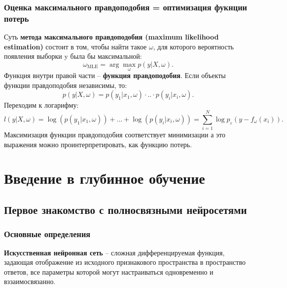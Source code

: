 \documentclass[a4paper, 10pt, openany]{book} %
\begin{document}
	\subsection{Оценка максимального правдоподобия = оптимизация фукнции потерь}
	
	Суть \textbf{метода максимального правдоподобия (maximum likelihood estimation)} состоит в том, чтобы найти такое $\omega$, для которого вероятность появления выборки y была бы максимальной:
	\begin{equation*}
	    \omega_{\text{MLE}} = \arg\max_\omega p(y|X, \omega).
	\end{equation*}
	Функция внутри правой части -- \textbf{функция правдоподобия}. Если объекты функции правдоподобия независимы, то:
	\begin{equation*}
	    p(y|X, \omega) = p(y_1|x_1, \omega)\cdot..\cdot p(y_i|x_i,\omega).
	\end{equation*}
	Переходим к логарифму:
	\begin{equation*}
	    l(y|X, \omega) = \log(p(y_1|x_1, \omega)) + ... + \log(p(y_i|x_i,\omega)) = \sum_{i=1}^N\log p_\varepsilon(y-f_\omega(x_i)).
	\end{equation*}
	Максимизация функции правдоподобия соответствует минимизации
	а это выражения можно проинтерпретировать, как функцию потерь.
	
	\chapter{Введение в глубинное обучение}
	
	\section{Первое знакомство с полносвязными нейросетями}
	
	\subsection{Основные определения}
	
	\textbf{Искусственная нейронная сеть} -- сложная дифференцируемая функция, задающая отображение из исходного признакового пространства в пространство ответов, все параметры которой могут настраиваться одновременно и вззаимосвязанно.
	
\end{document}
